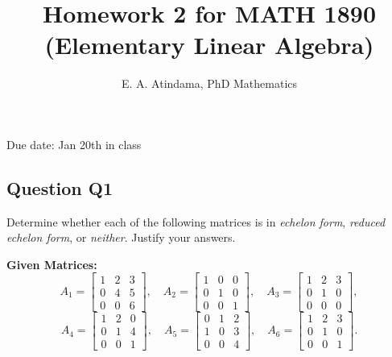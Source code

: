 \documentclass[a4paper,11pt,reqno]{amsart}
\title[MATH 1890 (Elementary Linear Algebra)]{Homework 2 for MATH 1890 (Elementary Linear Algebra)}
\author[Emmanuel Atindama]{E. A. Atindama, PhD Mathematics}
\numberwithin{equation}{section}
\begin{document}
\maketitle
Due date: Jan 20th in class

\subsection{Question Q1}\label{sec:q1}

    Determine whether each of the following matrices is in \textit{echelon form}, \textit{reduced echelon form}, or \textit{neither}. Justify your answers.

\textbf{Given Matrices:}
\[
A_1 = \begin{bmatrix} 
1 & 2 & 3 \\
0 & 4 & 5 \\
0 & 0 & 6 
\end{bmatrix}, \quad
A_2 = \begin{bmatrix} 
1 & 0 & 0 \\
0 & 1 & 0 \\
0 & 0 & 1 
\end{bmatrix}, \quad
A_3 = \begin{bmatrix} 
1 & 2 & 3 \\
0 & 1 & 0 \\
0 & 0 & 0 
\end{bmatrix},
\]
\[
A_4 = \begin{bmatrix} 
1 & 2 & 0 \\
0 & 1 & 4 \\
0 & 0 & 1 
\end{bmatrix}, \quad
A_5 = \begin{bmatrix} 
0 & 1 & 2 \\
1 & 0 & 3 \\
0 & 0 & 4 
\end{bmatrix}, \quad
A_6 = \begin{bmatrix} 
1 & 2 & 3 \\
0 & 1 & 0 \\
0 & 0 & 1 
\end{bmatrix}.
\]
\end{document}
